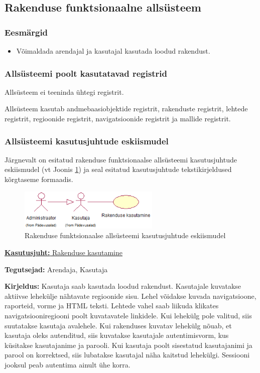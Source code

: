 \documentclass[a4paper,12pt]{article} %
\begin{document}
\subsection{Rakenduse funktsionaalne allsüsteem}
\subsubsection{Eesmärgid}
\begin{itemize}
\item Võimaldada arendajal ja kasutajal kasutada loodud rakendust.
\end{itemize}
\subsubsection{Allsüsteemi poolt kasutatavad registrid}
Allsüsteem ei teeninda ühtegi registrit.\par
Allsüsteem kasutab andmebaasiobjektide registrit, rakenduste registrit, lehtede registrit, regioonide registrit, navigatsioonide registrit ja mallide registrit.
\subsubsection{Allsüsteemi kasutusjuhtude eskiismudel}
Järgnevalt on esitatud rakenduse funktsionaalse allsüsteemi kasutusjuhtude eskiismudel (vt Joonis \ref{fig_rakenduse_funktsionaalse_allsüsteemi_kasutusjuhtude_eskiismudel}) ja seal esitatud kasutusjuhtude tekstikirjeldused kõrgtaseme formaadis.
\begin{figure}[H]
\centering
\includegraphics[width=0.6\textwidth]{./diagrams/application-subsystem-use-case-digram.png}
\caption{Rakenduse funktsionaalse allsüsteemi kasutusjuhtude eskiismudel}
\label{fig_rakenduse_funktsionaalse_allsüsteemi_kasutusjuhtude_eskiismudel}
\end{figure}

\underline{\textbf{Kasutusjuht:} Rakenduse kasutamine}
\par
\textbf{Tegutsejad:} Arendaja, Kasutaja
\par
\textbf{Kirjeldus:} Kasutaja saab kasutada loodud rakendust. Kasutajale kuvatakse aktiivse lehekülje nähtavate regioonide sisu. Lehel võidakse kuvada navigatsioone, raporteid, vorme ja HTML teksti. Lehtede vahel saab liikuda klikates navigatsiooniregiooni poolt kuvatavatele linkidele. Kui lehekülg pole valitud, siis suutatakse kasutaja avalehele. Kui rakenduses kuvatav lehekülg nõuab, et kasutaja oleks autenditud, siis kuvatakse kasutajale autentimisvorm, kus küsitakse kasutajanime ja parooli. Kui kasutaja poolt sisestatud kasutajanimi ja parool on korrektsed, siis lubatakse kasutajal näha kaitstud lehekülgi. Sessiooni jooksul peab autentima ainult ühe korra.
\par
\end{document}
